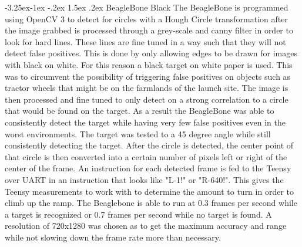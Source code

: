 \documentclass[onecolumn, draftclsnofoot, 10pt, compsoc]{IEEEtran}
\makeatletter
\renewcommand\paragraph{\@startsection{paragraph}{4}{\z@}%
                                     {-3.25ex\@plus -1ex \@minus -.2ex}%
                                     {1.5ex \@plus .2ex}%
                                     {\normalfont\normalsize\bfseries}}
\makeatother
\begin{document}
\paragraph{BeagleBone Black}
The BeagleBone is programmed using OpenCV 3 to detect for circles with a Hough Circle transformation after the image grabbed is processed through a grey-scale and canny filter in order to look for hard lines. These lines are fine tuned in a way such that they will not detect false positives. This is done by only allowing edges to be drawn for images with black on white. For this reason a black target on white paper is used. This was to circumvent the possibility of triggering false positives on objects such as tractor wheels that might be on the farmlands of the launch site. The image is then processed and fine tuned to only detect on a strong correlation to a circle that would be found on the target. As a result the BeagleBone was able to consistently detect the target while having very few false positives even in the worst environments. The target was tested to a 45 degree angle while still consistently detecting the target. After the circle is detected, the center point of that circle is then converted into a certain number of pixels left or right of the center of the frame. An instruction for each detected frame is fed to the Teensy over UART in an instruction that looks like "L-1!" or "R-640!". This gives the Teensy measurements to work with to determine the amount to turn in order to climb up the ramp. The Beaglebone is able to run at 0.3 frames per second while a target is recognized or 0.7 frames per second while no target is found. A resolution of 720x1280 was chosen as to get the maximum accuracy and range while not slowing down the frame rate more than necessary. 

\newpage

\vspace{0.5cm}
\end{document}
